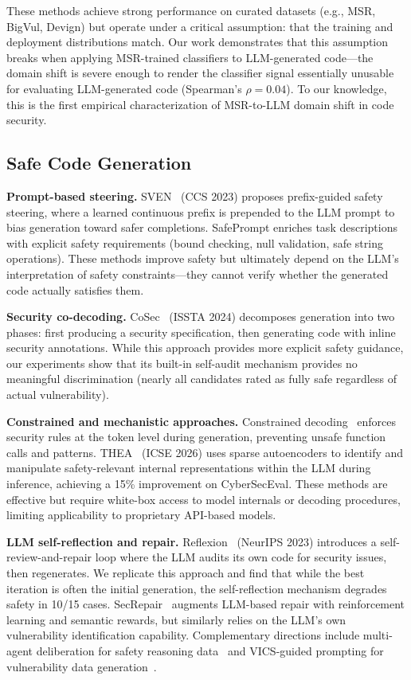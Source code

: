 \documentclass[10pt,conference]{IEEEtran}
\begin{document}
These methods achieve strong performance on curated datasets (e.g., MSR, BigVul, Devign) but operate under a critical assumption: that the training and deployment distributions match. Our work demonstrates that this assumption breaks when applying MSR-trained classifiers to LLM-generated code---the domain shift is severe enough to render the classifier signal essentially unusable for evaluating LLM-generated code (Spearman's $\rho=0.04$). To our knowledge, this is the first empirical characterization of MSR-to-LLM domain shift in code security.

\subsection{Safe Code Generation}

\textbf{Prompt-based steering.} SVEN~\cite{sven} (CCS 2023) proposes prefix-guided safety steering, where a learned continuous prefix is prepended to the LLM prompt to bias generation toward safer completions. SafePrompt enriches task descriptions with explicit safety requirements (bound checking, null validation, safe string operations). These methods improve safety but ultimately depend on the LLM's interpretation of safety constraints---they cannot verify whether the generated code actually satisfies them.

\textbf{Security co-decoding.} CoSec~\cite{cosec} (ISSTA 2024) decomposes generation into two phases: first producing a security specification, then generating code with inline security annotations. While this approach provides more explicit safety guidance, our experiments show that its built-in self-audit mechanism provides no meaningful discrimination (nearly all candidates rated as fully safe regardless of actual vulnerability).

\textbf{Constrained and mechanistic approaches.} Constrained decoding~\cite{constraineddecode} enforces security rules at the token level during generation, preventing unsafe function calls and patterns. THEA~\cite{thea} (ICSE 2026) uses sparse autoencoders to identify and manipulate safety-relevant internal representations within the LLM during inference, achieving a 15\% improvement on CyberSecEval. These methods are effective but require white-box access to model internals or decoding procedures, limiting applicability to proprietary API-based models.

\textbf{LLM self-reflection and repair.} Reflexion~\cite{reflexion} (NeurIPS 2023) introduces a self-review-and-repair loop where the LLM audits its own code for security issues, then regenerates. We replicate this approach and find that while the best iteration is often the initial generation, the self-reflection mechanism degrades safety in 10/15 cases. SecRepair~\cite{secrepair} augments LLM-based repair with reinforcement learning and semantic rewards, but similarly relies on the LLM's own vulnerability identification capability. Complementary directions include multi-agent deliberation for safety reasoning data~\cite{aidsafe} and VICS-guided prompting for vulnerability data generation~\cite{vics}.
\end{document}
